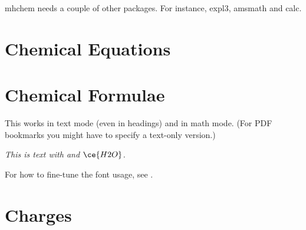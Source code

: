 \documentclass[a4paper,notitlepage,parskip=half]{scrreprt}
\begin{document}
mhchem needs a couple of other packages. For instance, expl3, amsmath and calc.


\section{Chemical Equations}

\begin{SideBySideExample}[xrightmargin=6cm]
\end{SideBySideExample}

\begin{SideBySideExample}[xrightmargin=6cm]
\end{SideBySideExample}



\section{Chemical Formulae}

\begin{SideBySideExample}[xrightmargin=2.5cm]
\end{SideBySideExample}

\begin{SideBySideExample}[xrightmargin=2.5cm]
\end{SideBySideExample}


This works in text mode (even in headings) and in math mode. (For PDF bookmarks you might have to specify a text-only version.)

{
\let\sffamilyorig\sffamily
\def\sffamily{\color{mhchem}\sffamilyorig}
\begin{SideBySideExample}[xrightmargin=5cm]
  \sffamily\itshape
  This is text with  and $\ce{H2O}$.
\end{SideBySideExample}
}

For how to fine-tune the font usage, see .


\section{Charges}

\begin{SideBySideExample}[xrightmargin=2.5cm]
\end{SideBySideExample}

\begin{SideBySideExample}[xrightmargin=2.5cm]
\end{SideBySideExample}
\end{document}

